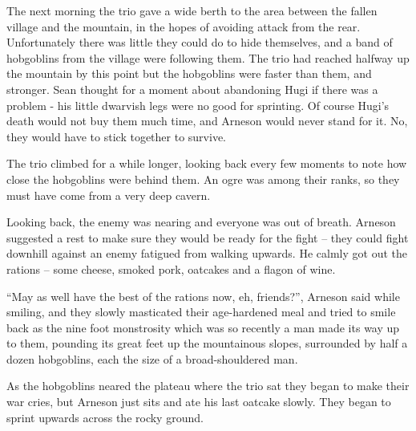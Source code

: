 \begin{exampletext}

The next morning the trio gave a wide berth to the area between the fallen village and the mountain, in the hopes of avoiding attack from the rear.
Unfortunately there was little they could do to hide themselves, and a band of hobgoblins from the village were following them.
The trio had reached halfway up the mountain by this point but the hobgoblins were faster than them, and stronger.
Sean thought for a moment about abandoning Hugi if there was a problem - his little dwarvish legs were no good for sprinting.
Of course Hugi's death would not buy them much time, and Arneson would never stand for it.
No, they would have to stick together to survive.

The trio climbed for a while longer, looking back every few moments to note how close the hobgoblins were behind them. An ogre was among their ranks, so they must have come from a very deep cavern.

Looking back, the enemy was nearing and everyone was out of breath.
Arneson suggested a rest to make sure they would be ready for the fight -- they could fight downhill against an enemy fatigued from walking upwards.
He calmly got out the rations -- some cheese, smoked pork, oatcakes and a flagon of wine.


``May as well have the best of the rations now, eh, friends?'', Arneson said while smiling, and they slowly masticated their age-hardened meal and tried to smile back as the nine foot monstrosity which was so recently a man made its way up to them, pounding its great feet up the mountainous slopes, surrounded by half a dozen hobgoblins, each the size of a broad-shouldered man.

As the hobgoblins neared the plateau where the trio sat they began to make their war cries, but Arneson just sits and ate his last oatcake slowly. They began to sprint upwards across the rocky ground.

\end{exampletext}


